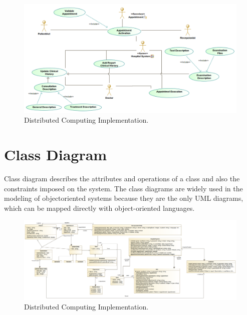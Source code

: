 \documentclass{article}
\begin{document}
            \begin{figure}[H]
                \centering 
                \includegraphics[width=1\linewidth]{./img/cHistories.png}
                \caption{Distributed Computing Implementation.}
                \label{fig:architecture}
            \end{figure}
            \section{Class Diagram} %
            Class diagram describes the attributes and operations of a class and also the constraints 
            imposed on the system. The class diagrams are widely used in the modeling of objectoriented 
            systems because they are the only UML diagrams, which can be mapped directly with object-oriented languages.
            \begin{figure}[H]
                \centering 
                \includegraphics[width=1\linewidth]{./img/class.png}
                \caption{Distributed Computing Implementation.}
                \label{fig:architecture}
            \end{figure}
\end{document}
